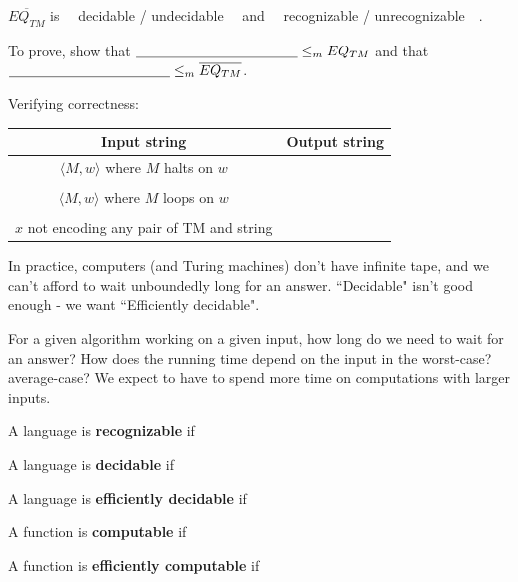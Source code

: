 \documentclass[12pt, oneside]{article}
\begin{document}
$\overline{EQ_{TM}}$ is ~~decidable /  undecidable~~ and ~~recognizable /  unrecognizable~~.

To  prove, show that  $\underline{\phantom{\hspace{1.6in}}}  \leq_m EQ_{TM}$
and that $\underline{\phantom{\hspace{1.6in}}}  \leq_m \overline{EQ_{TM}}$.


\vfill

Verifying correctness:
\begin{center}
\begin{tabular}{|c|c|}
\hline
Input string &  Output string \\
\hline
$\langle M, w \rangle$ where  $M$ halts on $w$ & \phantom{\hspace{4in}} \\
& \\
$\langle M, w \rangle$ where $M$ loops on $w$ & \\
&\\
$x$ not encoding any pair of  TM and string   &  \\
\hline
\end{tabular}
\end{center}

\vfill

\newpage

In practice, computers (and Turing machines) don't have infinite tape, 
and we can't afford to wait unboundedly long for an answer.
``Decidable" isn't good enough - we want ``Efficiently decidable".

For a given algorithm working on a given input, how long do we need to wait for an answer? 
How does the running time depend on the input in the worst-case? average-case? 
We expect to have to spend more time on computations with larger inputs.


A language is {\bf recognizable} if \underline{\phantom{\hspace{4.5in}}}

A language is {\bf decidable} if \underline{\phantom{\hspace{4.7in}}}

A language is {\bf efficiently  decidable} if \underline{\phantom{\hspace{4in}}}

A function is {\bf computable} if \underline{\phantom{\hspace{4.7in}}}

A function is {\bf efficiently computable} if \underline{\phantom{\hspace{4in}}}\\
\end{document}
